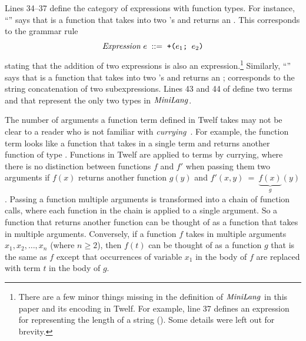 Lines 34--37 define the category of expressions
with function types.
For instance,
``''
says that  is a function that takes into
two 's and returns an .
This corresponds to the grammar rule
\[\mathit{Expression} \; e \; \mathrel{::=} \; \texttt{+($e_1$; $e_2$)}\]
stating that the addition of two expressions is also an expression.\footnote{There are a few minor things missing in the definition
of $\mathit{MiniLang}$ in this paper and its encoding in Twelf.
For example, line 37 defines an expression for representing the
length of a string ().
Some details were left out for brevity.}
Similarly, ``''
says that  is a function that takes into
two 's and returns an ;
 corresponds to the string concatenation of two
subexpressions.
Lines 43 and 44 of  define two terms
 and  that represent the only two
types in $\mathit{MiniLang}$.

The number of arguments a function term defined in Twelf
takes may not be clear to a reader who is not familiar with
\emph{currying}~\cite{CurryHaskel,CurryScala}.
For example, the  function term looks like a
function that takes in a single  term and returns
another function of type \mbox{}.
Functions in Twelf are applied to terms by currying,
where there is no distinction between
functions $f$ and $f'$ when passing them two arguments
if $f(x)$ returns another function $g(y)$ and
\mbox{$f'(x, y)$ = $\underbrace{f(x)}_{g}(y)$}.
Passing a function multiple arguments is transformed
into a chain of function calls, where each function in
the chain is applied to a single argument.
So a function that returns another function
can be thought of as a function that takes in multiple
arguments.
Conversely, if a function $f$ takes in multiple
arguments $x_1, x_2, \ldots, x_n$ (where $n \geq 2$),
then $f(t)$ can be thought of as a function $g$
that is the same as $f$ except that occurrences of variable $x_1$
in the body of $f$ are replaced with term $t$ in the body of $g$.


